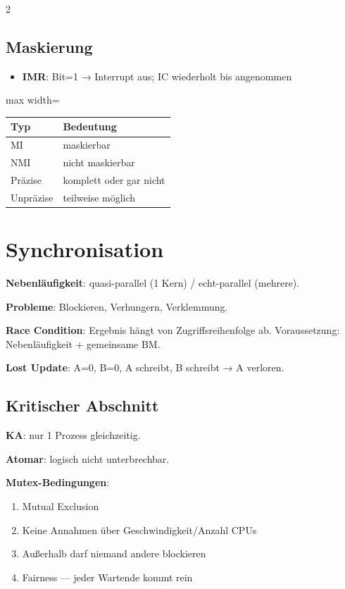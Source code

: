\documentclass[10pt, a4paper]{article}
\begin{document}
\begin{multicols}{2}
\subsection{Maskierung}
\begin{itemize}
  \item \textbf{IMR}: Bit=1 → Interrupt aus; IC wiederholt bis angenommen
\end{itemize}


{\small
\begin{adjustbox}{max width=\linewidth}
{\scriptsize
\begin{tabular}{ll}
\toprule
\textbf{Typ} & \textbf{Bedeutung} \\
\midrule
MI & maskierbar \\
NMI & nicht maskierbar \\
Präzise & komplett oder gar nicht \\
Unpräzise & teilweise möglich \\
\bottomrule
\end{tabular}
}
\end{adjustbox}
}



\section{Synchronisation}

\textbf{Nebenläufigkeit}: quasi-parallel (1 Kern) / echt-parallel (mehrere).


\textbf{Probleme}: Blockieren, Verhungern, Verklemmung.


\textbf{Race Condition}: Ergebnis hängt von Zugriffsreihenfolge ab. Voraussetzung: Nebenläufigkeit + gemeinsame BM.


\textbf{Lost Update}: A=0, B=0, A schreibt, B schreibt → A verloren.



\subsection{Kritischer Abschnitt}

\textbf{KA}: nur 1 Prozess gleichzeitig.


\textbf{Atomar}: logisch nicht unterbrechbar.


\textbf{Mutex-Bedingungen}:

\begin{enumerate}
  \item Mutual Exclusion
  \item Keine Annahmen über Geschwindigkeit/Anzahl CPUs
  \item Außerhalb darf niemand andere blockieren
  \item Fairness — jeder Wartende kommt rein
\end{enumerate}


\end{multicols}
\end{document}
